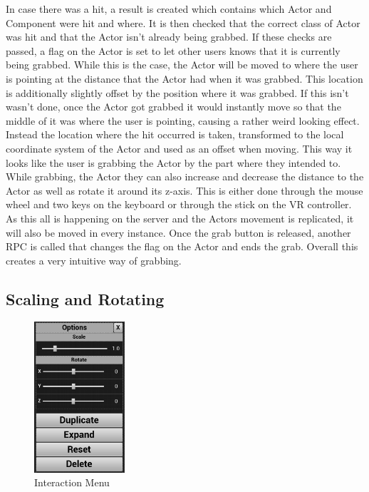 In case there was a hit, a result is created which contains which Actor and Component were hit and where. It is then checked that the correct class of Actor was hit and that the Actor isn't already being grabbed. If these checks are passed, a flag on the Actor is set to let other users knows that it is currently being grabbed. While this is the case, the Actor will be moved to where the user is pointing at the distance that the Actor had when it was grabbed. This location is additionally slightly offset by the position where it was grabbed. If this isn't wasn't done, once the Actor got grabbed it would instantly move so that the middle of it was where the user is pointing, causing a rather weird looking effect. Instead the location where the hit occurred is taken, transformed to the local coordinate system of the Actor and used as an offset when moving. This way it looks like the user is grabbing the Actor by the part where they intended to. While grabbing, the Actor they can also increase and decrease the distance to the Actor as well as rotate it around its z-axis. This is either done through the mouse wheel and two keys on the keyboard or through the stick on the VR controller. As this all is happening on the server and the Actors movement is replicated, it will also be moved in every instance. Once the grab button is released, another RPC is called that changes the flag on the Actor and ends the grab. Overall this creates a very intuitive way of grabbing.

\subsection{Scaling and Rotating}

\begin{figure}
	\centering
	\includegraphics[width=0.30\textwidth]{fig/InteractionMenu2.png}
	\caption[Interaction Menu instead of UI Editor]{Interaction Menu}
	\label{fig:InteractionMenu}
\end{figure}


